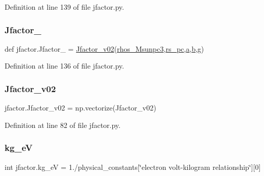 Definition at line 139 of file jfactor.\+py.

\mbox{\label{namespacejfactor_adfab35ee4763d30c17fe3a8791394e44}} 
\subsubsection{\texorpdfstring{Jfactor\+\_\+}{Jfactor\_}}
{\footnotesize\ttfamily def jfactor.\+Jfactor\+\_\+ = \hyperlink{namespacejfactor_abfd9403bf30810505dc44d7af9746a12}{Jfactor\+\_\+v02}(\hyperlink{namespacejfactor_aa9f6835eba853a5bb2b380ad7fb87010}{rhos\+\_\+\+Msunpc3},\hyperlink{namespacejfactor_ae602db7ab45f472ad4007d04def859f7}{rs\+\_\+pc},\hyperlink{namespacejfactor_ab5ce4a1ef962b5f938f157d0abc69a20}{a},\hyperlink{namespacejfactor_a52f3e9e591dbe4f5d14f760a578cb15b}{b},\hyperlink{namespacejfactor_a1e07b351e264fceb00b01b4a591e45e5}{g})}



Definition at line 136 of file jfactor.\+py.

\mbox{\label{namespacejfactor_abfd9403bf30810505dc44d7af9746a12}} 
\subsubsection{\texorpdfstring{Jfactor\+\_\+v02}{Jfactor\_v02}}
{\footnotesize\ttfamily jfactor.\+Jfactor\+\_\+v02 = np.\+vectorize(Jfactor\+\_\+v02)}



Definition at line 82 of file jfactor.\+py.

\mbox{\label{namespacejfactor_a2881505111ca34d6a84a5b09a5c19a86}} 
\subsubsection{\texorpdfstring{kg\+\_\+eV}{kg\_eV}}
{\footnotesize\ttfamily int jfactor.\+kg\+\_\+eV = 1./physical\+\_\+constants\mbox{[}\char`\"{}electron volt-\/kilogram relationship\char`\"{}\mbox{]}\mbox{[}0\mbox{]}}



